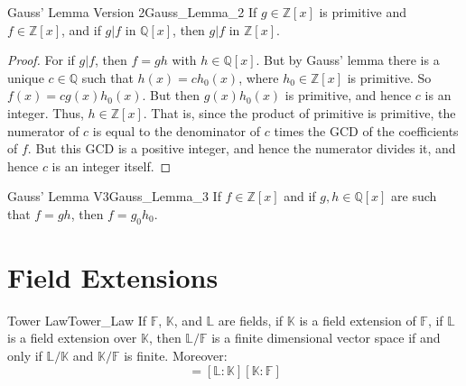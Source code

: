\documentclass{article}                                                        %
\begin{document}
        \begin{ltheorem}{Gauss' Lemma Version 2}{Gauss_Lemma_2}
            If $g\in\mathbb{Z}[x]$ is primitive and $f\in\mathbb{Z}[x]$, and if
            $g|f$ in $\mathbb{Q}[x]$, then $g|f$ in $\mathbb{Z}[x]$.
        \end{ltheorem}
        \begin{proof}
            For if $g|f$, then $f=gh$ with $h\in\mathbb{Q}[x]$. But by Gauss'
            lemma there is a unique $c\in\mathbb{Q}$ such that
            $h(x)=ch_{0}(x)$, where $h_{0}\in\mathbb{Z}[x]$ is primitive. So
            $f(x)=cg(x)h_{0}(x)$. But then $g(x)h_{0}(x)$ is primitive, and
            hence $c$ is an integer. Thus, $h\in\mathbb{Z}[x]$. That is, since
            the product of primitive is primitive, the numerator of $c$ is equal
            to the denominator of $c$ times the GCD of the coefficients of $f$.
            But this GCD is a positive integer, and hence the numerator divides
            it, and hence $c$ is an integer itself.
        \end{proof}
        \begin{ltheorem}{Gauss' Lemma V3}{Gauss_Lemma_3}
            If $f\in\mathbb{Z}[x]$ and if $g,h\in\mathbb{Q}[x]$ are such that
            $f=gh$, then $f=g_{0}h_{0}$.
        \end{ltheorem}
    \section{Field Extensions}
        \begin{ftheorem}{Tower Law}{Tower_Law}
            If $\mathbb{F}$, $\mathbb{K}$, and $\mathbb{L}$ are fields, if
            $\mathbb{K}$ is a field extension of $\mathbb{F}$, if $\mathbb{L}$
            is a field extension over $\mathbb{K}$, then $\mathbb{L}/\mathbb{F}$
            is a finite dimensional vector space if and only if
            $\mathbb{L}/\mathbb{K}$ and $\mathbb{K}/\mathbb{F}$ is finite.
            Moreover:
            \begin{equation*}
                [\mathbb{L}:\mathbb{F}]=
                [\mathbb{L}:\mathbb{K}][\mathbb{K}:\mathbb{F}]
            \end{equation*}
        \end{ftheorem}
\end{document}
